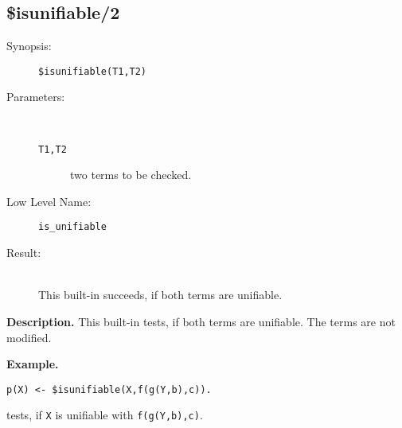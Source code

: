 %
%
%
\subsection{\$isunifiable/2}

\begin{description}
\item[Synopsis:]
	{\tt \$isunifiable(T1,T2)}
\item[Parameters:]\ \\[-0.5cm]
	\begin{description}
	\item[{\tt T1,T2}]
two terms to be checked.
	\end{description}
\item[Low Level Name:]
	{\tt is\_unifiable}
\item[Result:]\ \\
This built-in succeeds, if both terms are unifiable.
\end{description}

\vspace*{0.5cm}
\noindent
{\bf Description.}
This built-in tests, if both terms are unifiable. The terms are
not modified.

\vspace*{0.5cm}
\noindent
{\bf Example.}
\begin{verbatim}
p(X) <- $isunifiable(X,f(g(Y,b),c)).
\end{verbatim}
tests, if  {\tt X} is unifiable with {\tt f(g(Y,b),c)}.
 


